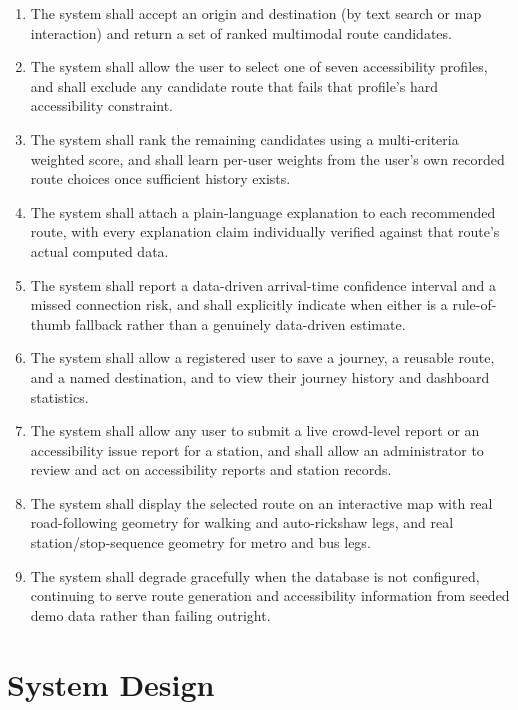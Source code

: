 \documentclass[12pt,a4paper]{report}
\begin{document}
\begin{enumerate}[leftmargin=*]
  \item The system shall accept an origin and destination (by text search or map interaction) and
    return a set of ranked multimodal route candidates.
  \item The system shall allow the user to select one of seven accessibility profiles, and shall
    exclude any candidate route that fails that profile's hard accessibility constraint.
  \item The system shall rank the remaining candidates using a multi-criteria weighted score, and
    shall learn per-user weights from the user's own recorded route choices once sufficient history
    exists.
  \item The system shall attach a plain-language explanation to each recommended route, with every
    explanation claim individually verified against that route's actual computed data.
  \item The system shall report a data-driven arrival-time confidence interval and a missed
    connection risk, and shall explicitly indicate when either is a rule-of-thumb fallback rather
    than a genuinely data-driven estimate.
  \item The system shall allow a registered user to save a journey, a reusable route, and a named
    destination, and to view their journey history and dashboard statistics.
  \item The system shall allow any user to submit a live crowd-level report or an accessibility
    issue report for a station, and shall allow an administrator to review and act on accessibility
    reports and station records.
  \item The system shall display the selected route on an interactive map with real road-following
    geometry for walking and auto-rickshaw legs, and real station/stop-sequence geometry for metro
    and bus legs.
  \item The system shall degrade gracefully when the database is not configured, continuing to
    serve route generation and accessibility information from seeded demo data rather than failing
    outright.
\end{enumerate}

\chapter{System Design}
\end{document}
